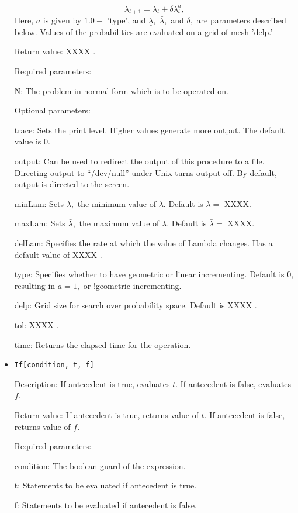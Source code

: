 \begin{itemize}
$$  
\lambda_{t+1} = \lambda_t +\delta \lambda_t^a,
$$ 
Here, $a$ is given by $1.0 - $ 'type', and $\underline\lambda,$
$\bar\lambda,$ and $\delta,$ are parameters described below.  Values
of the probabilities are evaluated on a grid of mesh 'delp.'

\item
[Return value:] XXXX .
\item
[Required parameters:]\hfil\null
	
\bd
\item  
[N:] The problem in normal form which is to be operated on.
\ed

\item
[Optional parameters:]\hfil\null

\bd
\item	
 [trace:] Sets the print level.  Higher values generate more output.
The default value is 0.
\item
[output:] Can be used to redirect the output of this procedure to a
file.  Directing output to ``/dev/null'' under Unix turns output off.
By default, output is directed to the screen.
\item
[minLam:] Sets $\underline\lambda,$ the minimum value of $\lambda.$
Default is $\underline\lambda = $ XXXX.
\item
[maxLam:]  Sets $\bar\lambda,$ the maximum value of $\lambda.$
Default is $\bar\lambda = $ XXXX.
\item
[delLam:] Specifies the rate at which the value of Lambda changes.
Has a default value of XXXX .
\item
[type:] Specifies whether to have geometric or linear incrementing.
Default is 0, resulting in $a = 1,$ or !geometric incrementing.
\item
[delp:] Grid size for search over probability space.  Default is XXXX .
\item
[tol:] XXXX .
\item
[time:] Returns the elapsed time for the operation.
\ed
\ed



\item 
\protect \large \begin{verbatim}
If[condition, t, f]
\end{verbatim} \normalsize
  
\bd
\item
[Description:] If antecedent is true, evaluates $t$.  If
antecedent is false, evaluates $f$. 
\item
[Return value:] If antecedent is true, returns value of $t$.  If
antecedent is false, returns value of $f$.  
\item
[Required parameters:]\hfil\null
\bd
\item
[condition:] The boolean guard of the expression.
\item
[t:] Statements to be evaluated if antecedent is true. 
\item
[f:] Statements to be evaluated if antecedent is false. 
\ed
\ed



\end{itemize}
